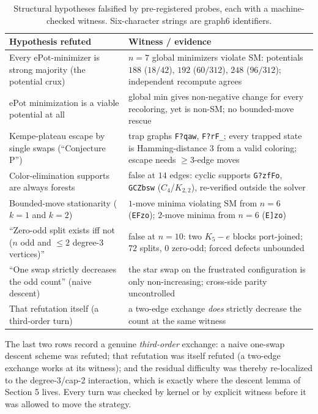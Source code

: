 \documentclass[11pt]{article}
\theoremstyle{definition}
\theoremstyle{remark}
\begin{document}
\begin{table}[t]
\small
\centering
\renewcommand{\arraystretch}{1.25}
\begin{tabular}{@{}p{}p{}@{}}
\toprule
Hypothesis refuted & Witness / evidence \\
\midrule
Every $\mathrm{ePot}$-minimizer is strong majority (the potential crux) & $n=7$ global minimizers violate SM: potentials $188$ ($18/42$), $192$ ($60/312$), $248$ ($96/312$); independent recompute agrees \\
$\mathrm{ePot}$ minimization is a viable potential at all & global min gives non-negative change for every recoloring, yet is non-SM; no bounded-move rescue \\
Kempe-plateau escape by single swaps (``Conjecture P'') & trap graphs \texttt{F?qaw}, \texttt{F?rF\_}; every trapped state is Hamming-distance $3$ from a valid coloring; escape needs $\ge 3$-edge moves \\
Color-elimination supports are always forests & false at $14$ edges: cyclic supports \texttt{G?zfFo}, \texttt{GCZbsw} ($C_4$/$K_{2,2}$), re-verified outside the solver \\
Bounded-move stationarity ($k=1$ and $k=2$) & $1$-move minima violating SM from $n=6$ (\texttt{EFzo}); $2$-move minima from $n=6$ (\texttt{E]zo}) \\
``Zero-odd split exists iff not ($n$ odd and $\le 2$ degree-3 vertices)'' & false at $n=10$: two $K_5{-}e$ blocks port-joined; $72$ splits, $0$ zero-odd; forced defects unbounded \\
``One swap strictly decreases the odd count'' (naive descent) & the star swap on the frustrated configuration is only non-increasing; cross-side parity uncontrolled \\
That refutation itself (a third-order turn) & a two-edge exchange \emph{does} strictly decrease the count at the same witness \\
\bottomrule
\end{tabular}
\caption{Structural hypotheses falsified by pre-registered probes, each with a machine-checked witness. Six-character strings are graph6 identifiers.}
\label{tab:refuted}
\end{table}

The last two rows record a genuine \emph{third-order} exchange: a naive one-swap descent scheme was refuted; that refutation was itself refuted (a two-edge exchange works at its witness); and the residual difficulty was thereby re-localized to the degree-3/cap-2 interaction, which is exactly where the descent lemma of Section 5 lives. Every turn was checked by kernel or by explicit witness before it was allowed to move the strategy.
\end{document}
